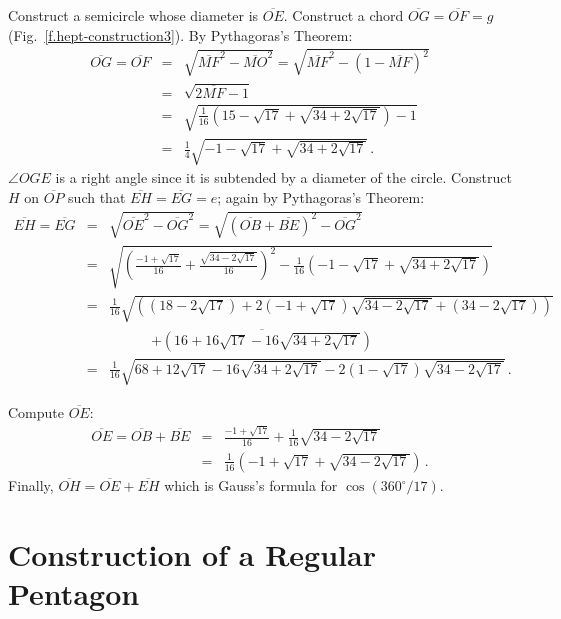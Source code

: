 Construct a semicircle whose diameter is $\overline{OE}$. Construct a chord $\overline{OG}=\overline{OF}=g$ (Fig.~\ref{f.hept-construction3}). By Pythagoras's Theorem:
\begin{eqnarray*}
\overline{OG}=\overline{OF}&=&\sqrt{\overline{MF}^2-\overline{MO}^2}=\sqrt{\overline{MF}^2-(1-\overline{MF})^2}\\
&=&\sqrt{2\overline{MF}-1}\\
&=&\sqrt{\frac{1}{16}\left(15-\sqrt{17}+\sqrt{34+2\sqrt{17}}\right)-1}\\
&=&\frac{1}{4}\sqrt{-1-\sqrt{17}+\sqrt{34+2\sqrt{17}}}\,.
\end{eqnarray*}
$\angle OGE$ is a right angle since it is subtended by a diameter of the circle. Construct $H$ on $\overline{OP}$ such that $\overline{EH}=\overline{EG}=e$; again by Pythagoras's Theorem:
\begin{eqnarray*}
\overline{EH}=\overline{EG}&=&\sqrt{\overline{OE}^2-\overline{OG}^2}=\sqrt{(\overline{OB}+\overline{BE})^2-\overline{OG}^2}\\
&=&\sqrt{\left(\frac{-1+\sqrt{17}}{16}+\frac{\sqrt{34-2\sqrt{17}}}{16}\right)^2-
\frac{1}{16}\left(-1-\sqrt{17}+\sqrt{34+2\sqrt{17}}\right)}
\\
&=&\frac{1}{16}\sqrt{\left(
(18-2\sqrt{17})+ 2(-1+\sqrt{17})\sqrt{34-2\sqrt{17}}+
(34-2\sqrt{17})\right)}\\
&&\quad\quad\quad\overline{
+\left(16+16\sqrt{17}-16\sqrt{34+2\sqrt{17}}\right)}\\
&=&\frac{1}{16}\sqrt{
68+12\sqrt{17}-16\sqrt{34+2\sqrt{17}}-2(1-\sqrt{17})\sqrt{34-2\sqrt{17}}
}\,.
\end{eqnarray*}

\newpage

Compute $\overline{OE}$:
\begin{eqnarray*}
\overline{OE}=\overline{OB}+\overline{BE}&=&\frac{-1+\sqrt{17}}{16}+\frac{1}{16}\sqrt{34-2\sqrt{17}}\\
&=&\frac{1}{16}\left(-1+\sqrt{17}+\sqrt{34-2\sqrt{17}}\right)\,.
\end{eqnarray*}
Finally, $\overline{OH}=\overline{OE}+\overline{EH}$ which is Gauss's formula for $\cos (360^\circ/17)$.



\section{Construction of a Regular Pentagon}\label{s.hept-pentagon}

